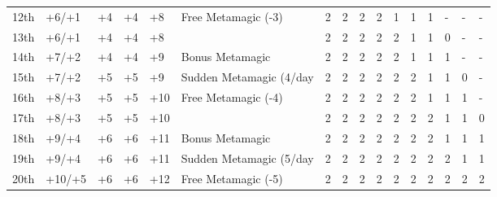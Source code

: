 \begin{table}[htb]
\begin{small}
\begin{tabular}{lp{1.2cm}p{0.7cm}p{0.7cm}p{0.7cm}p{4.7cm}llllllllll}
12th   &+6/+1  &+4 &+4 &+8  & Free Metamagic (-3)     &2 &2 &2 &2 &1 &1 &1 &- &- &- \\
13th   &+6/+1  &+4 &+4 &+8  &                         &2 &2 &2 &2 &2 &1 &1 &0 &- &- \\
14th   &+7/+2  &+4 &+4 &+9  & Bonus Metamagic         &2 &2 &2 &2 &2 &1 &1 &1 &- &- \\
15th   &+7/+2  &+5 &+5 &+9  & Sudden Metamagic (4/day &2 &2 &2 &2 &2 &2 &1 &1 &0 &- \\
16th   &+8/+3  &+5 &+5 &+10 & Free Metamagic (-4)     &2 &2 &2 &2 &2 &2 &1 &1 &1 &- \\
17th   &+8/+3  &+5 &+5 &+10 &                         &2 &2 &2 &2 &2 &2 &2 &1 &1 &0 \\
18th   &+9/+4  &+6 &+6 &+11 & Bonus Metamagic         &2 &2 &2 &2 &2 &2 &2 &1 &1 &1 \\
19th   &+9/+4  &+6 &+6 &+11 & Sudden Metamagic (5/day &2 &2 &2 &2 &2 &2 &2 &2 &1 &1 \\
20th   &+10/+5 &+6 &+6 &+12 & Free Metamagic (-5)     &2 &2 &2 &2 &2 &2 &2 &2 &2 &2 \\
\end{tabular}
\end{small}
\end{table}


